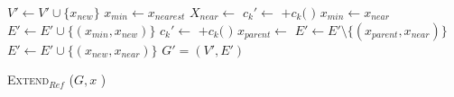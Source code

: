 \documentclass[conference]{IEEEtran}
\begin{document}
\begin{algorithm}
\begin{algorithmic}[1]
\State $ V' \leftarrow V' \cup \{ x_{new} \} $
\State $ x_{min} \leftarrow x_{nearest} $
\State $ X_{near} \leftarrow $ 
			\State $ c_{k}' \leftarrow $  $ + c_{k}( $  $ ) $ 
			\State $ x_{min} \leftarrow x_{near} $
			\EndIf
		\EndIf
	\EndFor
	\State $ E' \leftarrow E' \cup \{ ( x_{min}, x_{new} ) \} $
\EndIf
{}
	    \State $ c_{k}' \leftarrow $  $ + c_{k}( $  $ ) $ 
			\State $ x_{parent} \leftarrow $ 
			\State $ E' \leftarrow E' \setminus \{ ( x_{parent}, x_{near} ) \} $
			\State $ E' \leftarrow E' \cup \{ ( x_{new}, x_{near} ) \} $
		\EndIf
	\EndIf
\EndFor
\Return $ G' = (V', E') $ 
\end{algorithmic}
\label{alg:morrtstar:extend:ref}
\caption{ \textsc{Extend}$_{Ref} $ ($ G, x$ ) }
\end{algorithm} 
\end{document}
